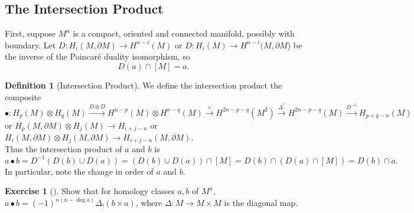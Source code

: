 \documentclass[reqno]{amsart}
\theoremstyle{definition}
\newtheorem{definition}[theorem]{Definition}
\newtheorem{exercise}[theorem]{Exercise}
\theoremstyle{remark}
\begin{document}
      \subsection{The Intersection Product}

      First, suppose $M^{n}$ is a compact, oriented and connected manifold,
      possibly with boundary. 
      Let $D \colon H_i (M, \partial M) \to 
      H^{n-i}(M)$ or $D \colon H_i (M) \to H^{n-i}(M, \partial M$)
      be the inverse of the Poincaré duality isomorphism, so
      \[
      D(a) \cap \left[ M \right]  = a.
      \] 
      
      \begin{definition}[Intersection Product]
          We define the intersection product the composite
          \[
          \bullet \colon
          H_p (M) \otimes H_q(M) 
          \stackrel{D \otimes D}{\to} 
          H^{n-p}(M) \otimes H^{n-q}(M) 
          \stackrel{\times }{\to} H^{2n-p-q}(M^2)
          \stackrel{\Delta^{*}}{\to} H^{2n-p-q}(M)
          \stackrel{D^{-1}}{\to} H_{p+q-n}(M)
          \] 
          or
          $H_p(M, \partial M) \otimes H_j(M) \to 
          H_{i+j-n}$ or
          $H_{i}(M, \partial M) \otimes H_j(M , \partial M) \to
          H_{i+j-n}(M, \partial M)$.\\

          Thus the intersection product of $a$ and $b$ is
          \[
          a \bullet b = 
          D^{-1} \left( D(b) \cup D(a) \right) 
          = \left( D (b) \cup  D(a) \right) \cap \left[ M \right] 
          = D(b) \cap \left( D(a) \cap \left[ M \right]  \right) 
          = D(b) \cap a.
          \] 
          In particular, note the change in order of $a$ and $b$.
      \end{definition}

      \begin{exercise}[]
          Show that for homology classes
          $a,b$ of $M^{n}$, 
          $a \bullet b = 
          (-1)^{n\left( n - \deg a \right) }\Delta_{!} (b \times a)$,
          where $\Delta \colon M \to M \times M$ is the
          diagonal map.
      \end{exercise}
\end{document}
